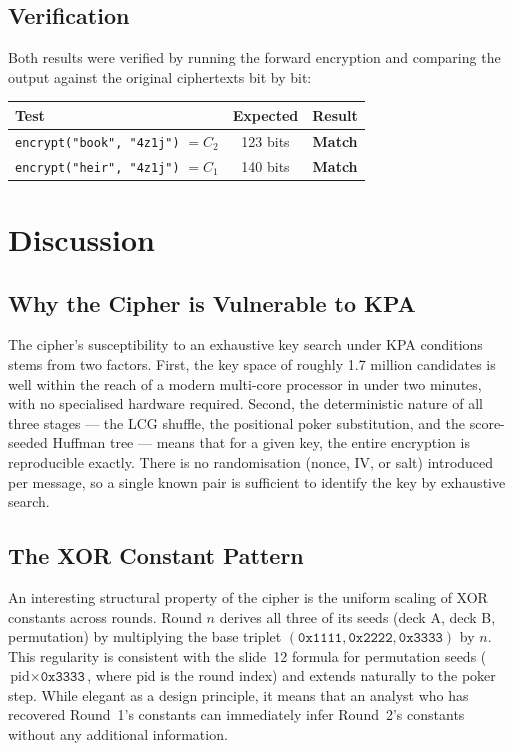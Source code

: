 \documentclass[12pt,a4paper]{article}
\begin{document}
\subsection{Verification}

Both results were verified by running the forward encryption and comparing the output against the original ciphertexts bit by bit:

\begin{center}
\begin{tabular}{lcc}
\toprule
\textbf{Test} & \textbf{Expected} & \textbf{Result} \\
\midrule
\texttt{encrypt("book", "4z1j")} $= C_2$ & 123 bits & \textbf{Match} \\
\texttt{encrypt("heir", "4z1j")} $= C_1$ & 140 bits & \textbf{Match} \\
\bottomrule
\end{tabular}
\end{center}

\section{Discussion}

\subsection{Why the Cipher is Vulnerable to KPA}

The cipher's susceptibility to an exhaustive key search under KPA conditions stems from two factors. First, the key space of roughly 1.7 million candidates is well within the reach of a modern multi-core processor in under two minutes, with no specialised hardware required. Second, the deterministic nature of all three stages — the LCG shuffle, the positional poker substitution, and the score-seeded Huffman tree — means that for a given key, the entire encryption is reproducible exactly. There is no randomisation (nonce, IV, or salt) introduced per message, so a single known pair is sufficient to identify the key by exhaustive search.

\subsection{The XOR Constant Pattern}

An interesting structural property of the cipher is the uniform scaling of XOR constants across rounds. Round $n$ derives all three of its seeds (deck A, deck B, permutation) by multiplying the base triplet $(\texttt{0x1111}, \texttt{0x2222}, \texttt{0x3333})$ by $n$. This regularity is consistent with the slide~12 formula for permutation seeds ($\text{pid} \times \texttt{0x3333}$, where pid is the round index) and extends naturally to the poker step. While elegant as a design principle, it means that an analyst who has recovered Round~1's constants can immediately infer Round~2's constants without any additional information.
\end{document}

